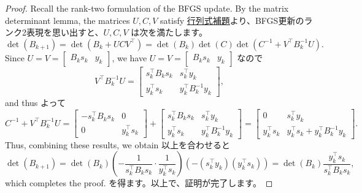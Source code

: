 \documentclass[0_main]{subfiles}
\begin{document}
\begin{proof}
    \ifEn
        Recall the rank-two formulation of the BFGS update. By the matrix determinant lemma, the matrices $U, C, V$ satisfy
    \else
        \href{https://en.wikipedia.org/wiki/Matrix_determinant_lemma}{行列式補題}より、BFGS更新のランク2表現を思い出すと、$U, C, V$ は次を満たします。
    \fi
    \begin{equation*}
        \det(B_{k+1}) =\det(B_k + U C V^\top)=\det(B_k)\det(C) \det \left(C^{-1} + V^\top B_k^{-1} U\right).
    \end{equation*}
    \ifEn
        Since $U=V=\begin{bmatrix}B_k s_k & y_k\end{bmatrix}$, we have
    \else
        $U=V=\begin{bmatrix}B_k s_k & y_k\end{bmatrix}$ なので
    \fi
    \begin{equation*}
        V^\top B_k^{-1} U = \begin{bmatrix} s_k^\top B_k s_k & s_k^\top y_k \\ y_k^\top s_k     & y_k^\top B_k^{-1} y_k \end{bmatrix},
    \end{equation*}
    \ifEn
        and thus
    \else
        よって
    \fi
    \begin{equation*}
        C^{-1} + V^\top B_k^{-1} U
        =
        \begin{bmatrix}-s_k^\top B_k s_k & 0 \\ 0 & y_k^\top s_k\end{bmatrix} +
        \begin{bmatrix} s_k^\top B_k s_k & s_k^\top y_k \\ y_k^\top s_k     & y_k^\top B_k^{-1} y_k \end{bmatrix}
        =
        \begin{bmatrix}0 & s_k^\top y_k \\ y_k^\top s_k & y_k^\top s_k + y_k^\top B_k^{-1} y_k \end{bmatrix}.
    \end{equation*}
    \ifEn
        Thus, combining these results, we obtain
    \else
        以上を合わせると
    \fi
    \begin{equation*}
        \det(B_{k+1})
        = \det(B_k) \left(-\frac{1}{s_k^\top B_k s_k} \cdot \frac{1}{y_k^\top s_k}\right) \left(- (s_k^\top y_k)(y_k^\top s_k)\right)
        = \det(B_k) \frac{y_k^\top s_k}{s_k^\top B_k s_k},
    \end{equation*}
    \ifEn
        which completes the proof.
    \else
        を得ます。以上で、証明が完了します。
    \fi
    \myQED
\end{proof}
\end{document}
